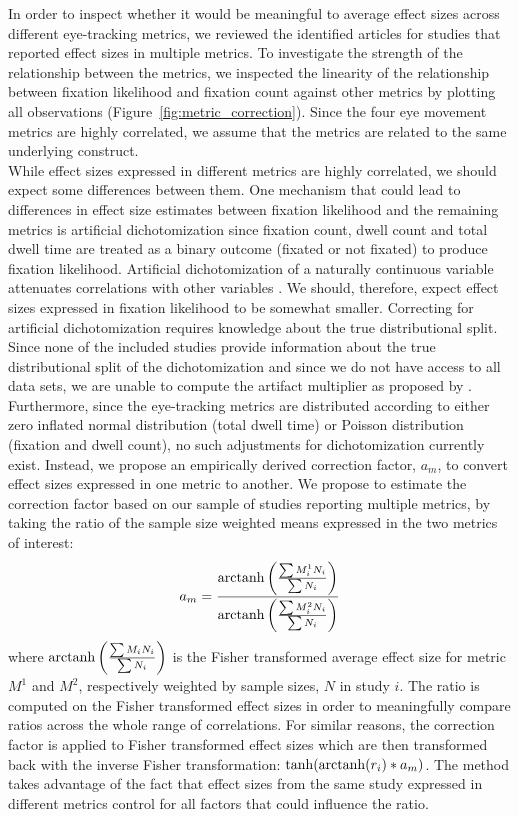 In order to inspect whether it would be meaningful to average effect sizes across different eye-tracking metrics, we reviewed the identified articles for studies that reported effect sizes in multiple metrics.  To investigate the strength of the relationship between the metrics, we inspected the linearity of the relationship between fixation likelihood and fixation count against other metrics by plotting all observations (Figure~\ref{fig:metric_correction}). Since the four eye movement metrics are highly correlated, we assume that the metrics are related to the same underlying construct.\\ 
While effect sizes expressed in different metrics are highly correlated, we should expect some differences between them. One mechanism that could lead to differences in effect size estimates between fixation likelihood and the remaining metrics is artificial dichotomization since fixation count, dwell count and total dwell time are treated as a binary outcome (fixated or not fixated) to produce fixation likelihood. Artificial dichotomization of a naturally continuous variable attenuates correlations with other variables \citep{hunter2004a}. We should, therefore, expect effect sizes expressed in fixation likelihood to be somewhat smaller. Correcting for artificial dichotomization requires knowledge about the true distributional split. Since none of the included studies provide information about the true distributional split of the dichotomization and since we do not have access to all data sets, we are unable to compute the artifact multiplier as proposed by \cite{hunter2004a}. Furthermore, since the eye-tracking metrics are distributed according to either zero inflated normal distribution (total dwell time) or Poisson distribution (fixation and dwell count), no such adjustments for dichotomization currently exist. Instead, we propose an empirically derived correction factor, $a_m$, to convert effect sizes expressed in one metric to another. We propose to estimate the correction factor based on our sample of studies reporting multiple metrics, by taking the ratio of the sample size weighted means expressed in the two metrics of interest:
%
\begin{equation}
\label{eq:metrics_correction}
a_m = \frac{\operatorname{arctanh} \left( \frac{\sum M_i^1 N_i}{\sum N_i} \right)}{\operatorname{arctanh} \left( \frac{\sum M_i^2 N_i}{\sum N_i} \right)}
\end{equation}
%
where $\operatorname{arctanh} \left( \frac{\sum M_i N_i}{\sum N_i} \right)$ is the Fisher transformed average effect size for metric $M^1$ and $M^2$, respectively weighted by sample sizes, $N$ in study $i$. The ratio is computed on the Fisher transformed effect sizes in order to meaningfully compare ratios across the whole range of correlations. For similar reasons, the correction factor is applied to Fisher transformed effect sizes which are then transformed back with the inverse Fisher transformation: $\tanh(\operatorname{arctanh}(r_i)*a_m)$. The method takes advantage of the fact that effect sizes from the same study expressed in different metrics control for all factors that could influence the ratio.\\    
